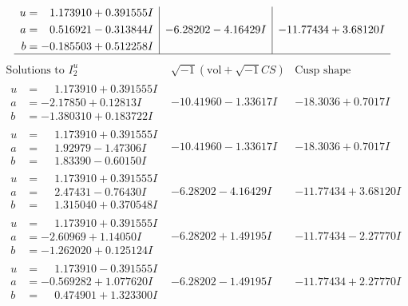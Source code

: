 \documentclass[1p]{elsarticle_modified}
\theoremstyle{definition}
\newcommand{\I}{\sqrt{-1}}
\begin{document}
$$\begin{array}{c|c|c}
\begin{aligned}
u &= \phantom{-}1.173910 + 0.391555 I \\
a &= \phantom{-}0.516921 - 0.313844 I \\
b &= -0.185503 + 0.512258 I\end{aligned}
 & -6.28202 - 4.16429 I & -11.77434 + 3.68120 I\\
 \hline 
 \end{array}$$\newpage$$\begin{array}{c|c|c}  
\text{Solutions to }I^u_{2}& \I (\text{vol} + \sqrt{-1}CS) & \text{Cusp shape}\\
 \hline 
\begin{aligned}
u &= \phantom{-}1.173910 + 0.391555 I \\
a &= -2.17850 + 0.12813 I \\
b &= -1.380310 + 0.183722 I\end{aligned}
 & -10.41960 - 1.33617 I & -18.3036 + 0.7017 I \\ \hline\begin{aligned}
u &= \phantom{-}1.173910 + 0.391555 I \\
a &= \phantom{-}1.92979 - 1.47306 I \\
b &= \phantom{-}1.83390 - 0.60150 I\end{aligned}
 & -10.41960 - 1.33617 I & -18.3036 + 0.7017 I \\ \hline\begin{aligned}
u &= \phantom{-}1.173910 + 0.391555 I \\
a &= \phantom{-}2.47431 - 0.76430 I \\
b &= \phantom{-}1.315040 + 0.370548 I\end{aligned}
 & -6.28202 - 4.16429 I & -11.77434 + 3.68120 I \\ \hline\begin{aligned}
u &= \phantom{-}1.173910 + 0.391555 I \\
a &= -2.60969 + 1.14050 I \\
b &= -1.262020 + 0.125124 I\end{aligned}
 & -6.28202 + 1.49195 I & -11.77434 - 2.27770 I \\ \hline\begin{aligned}
u &= \phantom{-}1.173910 - 0.391555 I \\
a &= -0.569282 + 1.077620 I \\
b &= \phantom{-}0.474901 + 1.323300 I\end{aligned}
 & -6.28202 - 1.49195 I & -11.77434 + 2.27770 I \\ \hline\begin{aligned}

\end{aligned}
\end{array}$$
\end{document}
